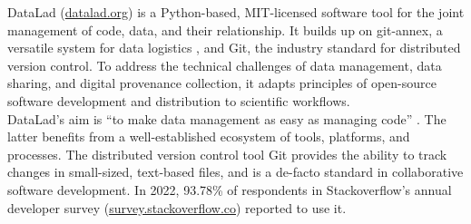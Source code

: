 
DataLad (\href{http://datalad.org}{datalad.org}) is a Python-based, MIT-licensed software tool for the joint management of code, data, and their relationship.
It builds up on git-annex, a versatile system for data logistics \citep{hessannex}, and Git, the industry standard for distributed version control.
To address the technical challenges of data management, data sharing, and digital provenance collection, it adapts principles of open-source software development and distribution to scientific workflows. \\
DataLad's aim is ``to make data management as easy as managing code'' \citep{Halchenko2021}.
The latter benefits from a well-established ecosystem of tools, platforms, and processes.
The distributed version control tool Git provides the ability to track changes in small-sized, text-based files, and is a de-facto standard in collaborative software development. In 2022, 93.78\% of respondents in Stackoverflow's annual developer survey (\url{survey.stackoverflow.co}) reported to use it.
